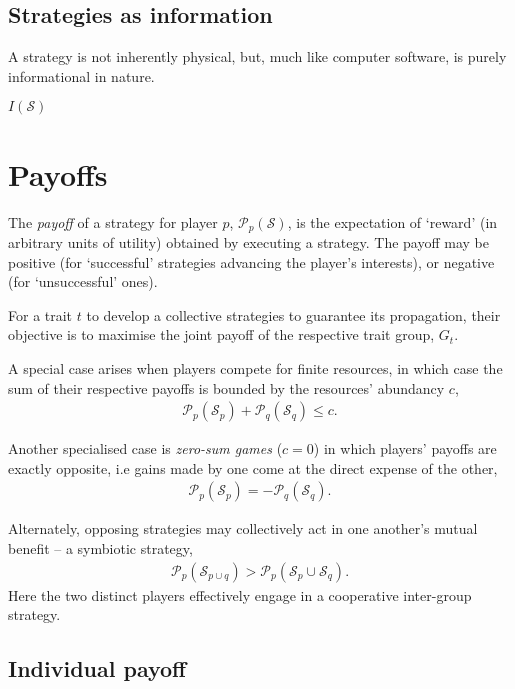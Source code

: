 \documentclass[twocolumn, aps, rmp, amsmath, amssymb, nofootinbib, superscriptaddress, longbibliography, floatfix, table-of-contents, eqsecnum]{revtex4-1}
\begin{document}
\subsection{Strategies as information}

A strategy is not inherently physical, but, much like computer software, is purely informational in nature.

$I(\mathcal{S})$

\section{Payoffs}

The \textit{payoff} of a strategy for player $p$, $\mathcal{P}_p(\mathcal{S})$, is the expectation of `reward' (in arbitrary units of utility) obtained by executing a strategy. The payoff may be positive (for `successful' strategies advancing the player's interests), or negative (for `unsuccessful' ones).

For a trait $t$ to develop a collective strategies to guarantee its propagation, their objective is to maximise the joint payoff of the respective trait group, $G_t$.

A special case arises when players compete for finite resources, in which case the sum of their respective payoffs is bounded by the resources' abundancy $c$,
\begin{align}
	\mathcal{P}_p(\mathcal{S}_p) + \mathcal{P}_q(\mathcal{S}_q) \leq c.
\end{align}

Another specialised case is \textit{zero-sum games} ($c=0$) in which players' payoffs are exactly opposite, i.e gains made by one come at the direct expense of the other,
\begin{align}
\mathcal{P}_p(\mathcal{S}_p) = -\mathcal{P}_q(\mathcal{S}_q).
\end{align}

Alternately, opposing strategies may collectively act in one another's mutual benefit -- a symbiotic strategy,
\begin{align}
\mathcal{P}_p(\mathcal{S}_{p\cup q}) > \mathcal{P}_p(\mathcal{S}_p\cup \mathcal{S}_q).
\end{align}
Here the two distinct players effectively engage in a cooperative inter-group strategy.

\subsection{Individual payoff}
\end{document}
